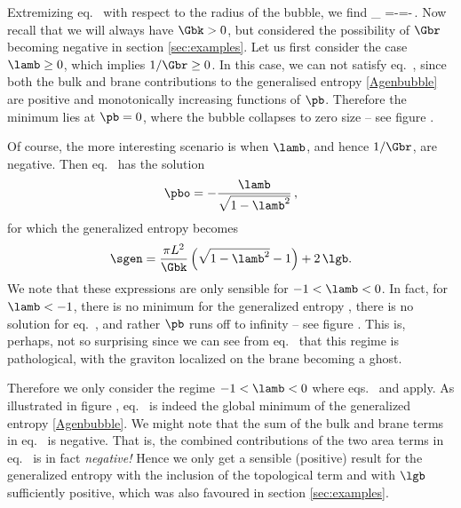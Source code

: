 Extremizing eq.~ with respect to the radius of the bubble, we find
\beq\label{gamdot}
\partial_{\pb} \qquad
\implies\qquad {}=-\lamb=-\,.
\eeq
Now recall that we will always have $\Gbk>0$, but considered the possibility of $\Gbr$ becoming negative in section \ref{sec:examples}. Let us first consider the case $\lamb\ge 0$, which implies $1/\Gbr\ge 0$. In this case, we can not satisfy eq.~, since both the bulk and brane contributions to the generalised entropy \eqref{Agenbubble} are positive and monotonically increasing functions of $\pb$. Therefore the minimum lies at $\pb=0$, \ie where the bubble collapses to zero size -- see figure . 

Of course, the more interesting scenario is when $\lamb$, and hence
$1/\Gbr$, are negative. Then eq.~ has the solution
\begin{align}
\pbo=-\frac{\lamb}{\sqrt{1-\lamb^2}}\,,
\label{cookie}
\end{align}
for which the generalized entropy  becomes
\begin{align}\label{Sbubble}
\sgen= \frac{\pi L^2}{\Gbk} \left( \sqrt{1-\lamb^2} - 1 \right)+2\,\lgb .
\end{align}
We note that these expressions are only sensible for $-1<\lamb<0$. In fact, for $\lamb<-1$, there is no minimum for the generalized entropy , \ie there is no solution for eq.~, and rather $\pb$ runs off to infinity -- see figure .  This is, perhaps, not so surprising since we can see from eq.~ that this regime is pathological, with the graviton localized on the brane becoming a ghost.

Therefore we only consider the regime $-1<\lamb<0$ where eqs.~ and  apply. As illustrated in figure , eq.~ is indeed the global minimum of the generalized entropy \eqref{Agenbubble}. We might note that the sum of the bulk and brane terms in eq.~ is negative. That is, the combined contributions of the two area terms in eq.~ is in fact {\it negative!} Hence we only get a sensible (\ie positive) result for the generalized entropy  with the inclusion of the topological term  and with $\lgb$ sufficiently positive, which was also favoured in section \ref{sec:examples}.
%

